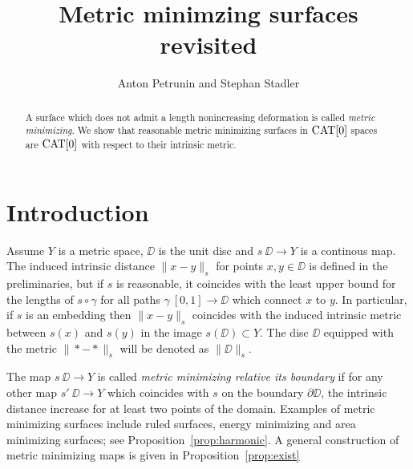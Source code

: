 \documentclass{article}
\begin{document}
\title{Metric minimzing surfaces revisited}
\author{Anton Petrunin and Stephan Stadler}


\date{}

\maketitle

\begin{abstract}
A surface which does not admit a length nonincreasing deformation is called \emph{metric minimizing}.
We show that reasonable metric minimizing surfaces in $\mathop{\rm CAT}\nolimits[0]$ spaces are $\mathop{\rm CAT}\nolimits[0]$ with respect to their intrinsic metric. 

\end{abstract}

\section{Introduction}

Assume $Y$ is a metric space, 
$\DD$ is the unit disc 
and $s\:\DD\to Y$ is a continous map.
The induced intrinsic distance $\|x-y\|_s$ for points $x,y\in\DD$ is defined in the preliminaries,
but if $s$ is reasonable, it coincides with the least upper bound for the lengths of $s\circ\gamma$ for all paths $\gamma\:[0,1]\to \DD$ which connect $x$ to $y$.
In particular, if $s$ is an embedding then $\|x-y\|_s$ coincides with the induced intrinsic metric between $s(x)$ and $s(y)$ in the image $s(\DD)\subset Y$.
The disc $\DD$ equipped with the metric $\|{*}-{*}\|_s$ will be denoted as $\|\DD\|_s$.

The map $s\:\DD\to Y$ is called \emph{metric minimizing relative its boundary} if for any other map $s'\:\DD\to Y$ which coincides with $s$ on the boundary $\partial \DD$, 
the intrinsic distance increase for at least two points of the domain.
Examples of metric minimizing surfaces include
ruled surfaces, energy minimizing and area minimizing surfaces; 
see Proposition~\ref{prop:harmonic}.
A general construction of metric minimizing maps is given in Proposition~\ref{prop:exist}
\end{document}

